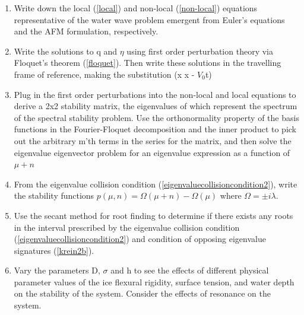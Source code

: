 \documentclass{article}
\begin{document}
\begin{enumerate}
  \item Write down the local (\ref{local}) and non-local (\ref{non-local}) equations representative of the water wave problem emergent from Euler's equations and the AFM formulation, respectively.
  \item Write the solutions to q and \(\eta\) using first order perturbation theory via Floquet's theorem (\ref{floquet}). Then write these solutions in the travelling frame of reference, making the substitution (x \implies x - \(V_{0}\)t)
  \item Plug in the first order perturbations into the non-local and local equations to derive a 2x2 stability matrix, the eigenvalues of which represent the spectrum of the spectral stability problem. Use the orthonormality property of the basis functions in the Fourier-Floquet decomposition and the inner product to pick out the arbitrary m'th terms in the series for the matrix, and then solve the eigenvalue eigenvector problem for an eigenvalue expression as a function of \(\mu + n\)
  \item From the eigenvalue collision condition (\ref{eigenvaluecollisioncondition2}), write the stability functions \(p(\mu,n) = \Omega(\mu + n) - \Omega(\mu)\) where \( \Omega = \pm i\lambda\). 
  \item Use the secant method for root finding to determine if there exists any roots in the interval prescribed by the eigenvalue collision condition (\ref{eigenvaluecollisioncondition2}) and condition of opposing eigenvalue signatures (\ref{krein2b}). 
  \item Vary the parameters D, \(\sigma\) and h to see the effects of different physical parameter values of the ice flexural rigidity, surface tension, and water depth on the stability of the system. Consider the effects of resonance on the system.
\end{enumerate}
\\
\end{document}
